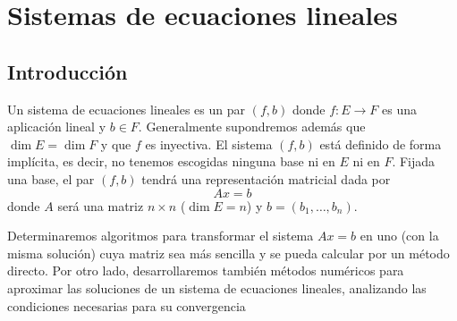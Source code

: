  \chapter{Sistemas de ecuaciones lineales}  
 \section{Introducción}
 Un sistema de ecuaciones lineales es un par $(f,b)$ donde $f: E \longrightarrow F$ es una aplicación lineal y $b \in F$. Generalmente supondremos además que $\dim E = \dim F$ y que $f$ es inyectiva. El sistema $(f,b)$ está definido de forma implícita, es decir, no tenemos escogidas ninguna base ni en $E$ ni en $F$. Fijada una base, el par $(f,b)$ tendrá una representación matricial dada por
            $$Ax=b$$
            donde $A$ será una matriz $n\times n $ ($\dim E=n$) y $b=(b_1,\ldots,b_n)$.       
            
Determinaremos algoritmos para transformar el sistema $Ax=b$ en uno (con la misma solución) cuya matriz sea más sencilla y se pueda calcular por un método directo. Por otro lado, desarrollaremos también métodos numéricos para aproximar las soluciones de un sistema de ecuaciones lineales, analizando las condiciones necesarias para su convergencia
